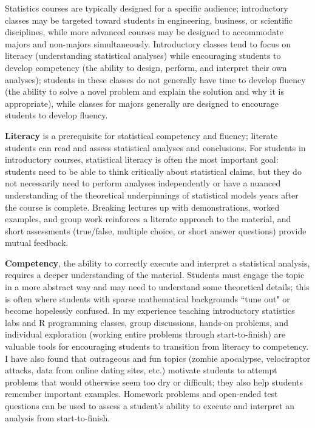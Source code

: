 \documentclass[10pt,letterpaper,sans,unicode]{moderncv}        %
\begin{document}
\vspace{1cm}\hspace{12pt}
Statistics courses are typically designed for a specific audience; introductory classes may be targeted toward students in engineering, business, or scientific disciplines, while more advanced courses may be designed to accommodate majors and non-majors simultaneously. Introductory classes tend to focus on literacy (understanding statistical analyses) while encouraging students to develop competency (the ability to design, perform, and interpret their own analyses); students in these classes do not generally have time to develop fluency (the ability to solve a novel problem and explain the solution and why it is appropriate), while classes for majors generally are designed to encourage students to develop fluency.

\textbf{Literacy} is a prerequisite for statistical competency and fluency; literate students can read and assess statistical analyses and conclusions. For students in introductory courses, statistical literacy is often the most important goal: students need to be able to think critically about statistical claims, but they do not necessarily need to perform analyses independently or have a nuanced understanding of the theoretical underpinnings of statistical models years after the course is complete. Breaking lectures up with demonstrations, worked examples, and group work reinforces a literate approach to the material, and short assessments (true/false, multiple choice, or short answer questions) provide mutual feedback. 

\textbf{Competency}, the ability to correctly execute and interpret a statistical analysis, requires a deeper understanding of the material. Students must engage the topic in a more abstract way and may need to understand some theoretical details; this is often where students with sparse mathematical backgrounds ``tune out" or become hopelessly confused. In my experience teaching introductory statistics labs and R programming classes, group discussions, hands-on problems, and individual exploration (working entire problems through start-to-finish) are valuable tools for encouraging students to transition from literacy to competency. I have also found that outrageous and fun topics (zombie apocalypse, velociraptor attacks, data from online dating sites, etc.) motivate students to attempt problems that would otherwise seem too dry or difficult; they also help students remember important examples. Homework problems and open-ended test questions can be used to assess a student's ability to execute and interpret an analysis from start-to-finish. 
\end{document}
